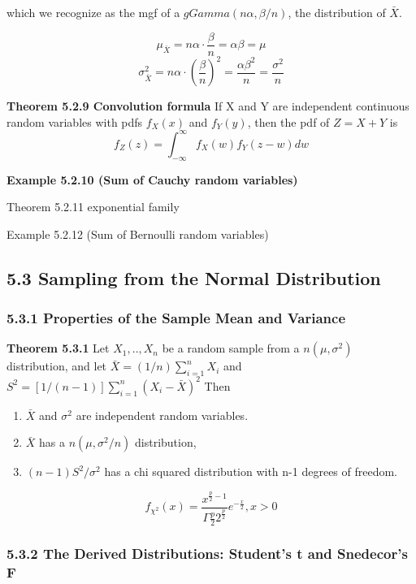 \documentclass[6pt,Portrait]{article}
\providecommand{\tightlist}{%
  \setlength{\itemsep}{0pt}\setlength{\parskip}{0pt}}
\begin{document}
which we recognize as the mgf of a \(gGamma(n\alpha,\beta/n)\), the
distribution of \(\bar X\).

\[\mu_{\bar X}=n\alpha\cdot\frac\beta n=\alpha\beta=\mu\]
\[\sigma^2_{\bar X}=n\alpha\cdot(\frac\beta n)^2=\frac{\alpha\beta^2}n=\frac{\sigma^2}n\]

\textbf{Theorem 5.2.9 Convolution formula} If X and Y are independent
continuous random variables with pdfs \(f_X(x)\) and \(f_Y(y)\), then
the pdf of \(Z=X+Y\) is
\[f_Z(z) =\int_{-\infty}^{\infty}f_X(w)f_Y(z-w)dw\]

\textbf{Example 5.2.10 (Sum of Cauchy random variables)}

Theorem 5.2.11 exponential family

Example 5.2.12 (Sum of Bernoulli random variables)

\hypertarget{sampling-from-the-normal-distribution}{%
\subsection{5.3 Sampling from the Normal
Distribution}\label{sampling-from-the-normal-distribution}}

\hypertarget{properties-of-the-sample-mean-and-variance}{%
\subsubsection{5.3.1 Properties of the Sample Mean and
Variance}\label{properties-of-the-sample-mean-and-variance}}

\textbf{Theorem 5.3.1} Let \(X_1,..,X_n\) be a random sample from a
\(n (\mu,\sigma^2)\) distribution, and let
\(\bar X=(1/n)\sum_{i=1}^nX_i\) and
\(S^2=[1/(n-1)]\sum_{i=1}^n(X_i-\bar X)^2\) Then

\begin{enumerate}
\def\labelenumi{\alph{enumi}.}
\tightlist
\item
  \(\bar X\) and \(\sigma^2\) are independent random variables.
\item
  \(\bar X\) has a \(n(\mu,\sigma^2/n)\) distribution,
\item
  \((n-1)S^2/\sigma^2\) has a chi squared distribution with n-1 degrees
  of freedom.
\end{enumerate}

\[ f_{\chi^2}(x)=\frac{x^{\frac{p}2-1}}{\Gamma \frac{p}2 2^{\frac{p}2}}e^{-\frac{x}2}, x>0\]

\hypertarget{the-derived-distributions-students-t-and-snedecors-f}{%
\subsubsection{5.3.2 The Derived Distributions: Student's t and
Snedecor's
F}\label{the-derived-distributions-students-t-and-snedecors-f}}
\end{document}
